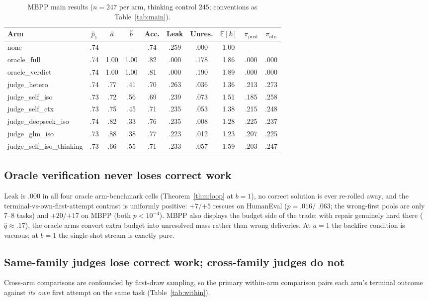 \documentclass[10pt]{article}
\begin{document}
\begin{table}[t]
\centering\small
\caption{MBPP main results ($n{=}247$ per arm, thinking control
$245$; conventions as Table~\ref{tab:main}).}
\label{tab:mbpp-main}
\begin{tabular}{lccccccccc}
\toprule
Arm & $\hat p_1$ & $\hat a$ & $\hat b$ & Acc. & Leak &
Unres. & $\mathbb{E}[k]$ & $\pi_{\mathrm{pred}}$ &
$\pi_{\mathrm{obs}}$\\
\midrule
none & .74 & -- & -- & .74 & .259 & .000 & 1.00 & -- & --\\
oracle\_full & .74 & 1.00 & 1.00 & .82 & .000 & .178 & 1.86 & .000 & .000\\
oracle\_verdict & .74 & 1.00 & 1.00 & .81 & .000 & .190 & 1.89 & .000 & .000\\
judge\_hetero & .74 & .77 & .41 & .70 & .263 & .036 & 1.36 & .213 & .273\\
judge\_self\_iso & .73 & .72 & .56 & .69 & .239 & .073 & 1.51 & .185 & .258\\
judge\_self\_ctx & .73 & .75 & .45 & .71 & .235 & .053 & 1.38 & .215 & .248\\
judge\_deepseek\_iso & .74 & .82 & .33 & .76 & .235 & .008 & 1.28 & .225 & .237\\
judge\_glm\_iso & .73 & .88 & .38 & .77 & .223 & .012 & 1.23 & .207 & .225\\
judge\_self\_iso\_thinking & .73 & .66 & .55 & .71 & .233 & .057 & 1.59 & .203 & .247\\
\bottomrule
\end{tabular}
\end{table}

\subsection{Oracle verification never loses correct work}
Leak is $.000$ in all four oracle arm-benchmark cells
(Theorem~\ref{thm:loop} at $b{=}1$), no correct solution is ever
re-rolled away, and the terminal-vs-own-first-attempt contrast is
uniformly positive: $+7$/$+5$ rescues on HumanEval ($p = .016$/
$.063$; the wrong-first pools are only 7--8 tasks) and
$+20$/$+17$ on MBPP (both $p < 10^{-4}$).  MBPP also displays the
budget side of the trade: with repair genuinely hard there
($\hat q \approx .17$), the oracle arms convert extra budget into
unresolved mass rather than wrong deliveries.  At
$a = 1$ the backfire condition is vacuous; at $b = 1$ the
single-shot stream is exactly pure.

\subsection{Same-family judges lose correct work; cross-family
judges do not}
Cross-arm comparisons are confounded by first-draw sampling, so
the primary within-arm comparison pairs each arm's terminal
outcome against \emph{its own} first attempt on the same task
(Table~\ref{tab:within}).
\end{document}
